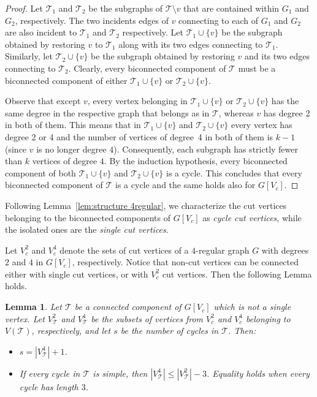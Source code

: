 \documentclass{article}
\newtheorem{lemma}{Lemma}
\begin{document}
\begin{proof}
            Let $\mathcal{T}_1$ and $\mathcal{T}_2$ be the subgraphs of $\mathcal{T}\setminus v$ that are contained within $G_1$ and $G_2$, respectively. 
            The two incidents edges of $v$ connecting to each of $G_1$ and $G_2$ are also incident to $\mathcal{T}_1$ and $\mathcal{T}_2$ respectively.
            Let $\mathcal{T}_1 \cup \{v\}$ be the subgraph obtained by restoring $v$ to $\mathcal{T}_1$ along with its two edges connecting to $\mathcal{T}_1$.
            Similarly, let $\mathcal{T}_2\cup \{v\}$ be the subgraph obtained by restoring $v$ and its two edges connecting to $\mathcal{T}_2$.
            Clearly, every biconnected component of $\mathcal{T}$ must be a biconnected component of either $\mathcal{T}_1\cup\{v\}$ or $\mathcal{T}_2\cup\{v\}$.
            
            Observe that except $v$, every vertex belonging in $\mathcal{T}_1\cup\{v\}$ or $\mathcal{T}_2\cup\{v\}$ has the same degree in the respective graph that belongs as in $\mathcal{T}$, whereas $v$ has degree 2 in both of them.
            This means that in $\mathcal{T}_1\cup\{v\}$ and $\mathcal{T}_2\cup\{v\}$ every vertex has degree 2 or 4 and the number of vertices of degree~4 in both of them is $k-1$ (since $v$ is no longer degree $4$).
            Consequently, each subgraph has strictly fewer than $k$ vertices of degree $4$. 
            By the induction hypothesis, every biconnected component of both $\mathcal{T}_1\cup\{v\}$ and $\mathcal{T}_2\cup\{v\}$ is a cycle.
            This concludes that every biconnected component of $\mathcal{T}$ is a cycle and the same holds also for $G[V_c]$.
        \end{proof}

        Following Lemma~\ref{lem:structure 4regular}, we characterize the cut vertices belonging to the biconnected components of $G[V_c]$ as \emph{cycle cut vertices}, while the isolated ones are the \emph{single cut vertices}.

        Let $V^2_{c}$ and $V^4_{c}$ denote the sets of cut vertices of a $4$-regular graph $G$ with degrees $2$ and $4$ in $G[V_c]$, respectively.
        Notice that non-cut vertices can be connected either with single cut vertices, or with $V^2_{c}$ cut vertices. 
        Then the following Lemma holds.

        \begin{lemma}\label{lem:count_c}
            Let $\mathcal{T}$ be a connected component of $G[V_c]$ which is not a single vertex.
            Let $V^2_{\mathcal{T}}$ and $V^4_{\mathcal{T}}$ be the subsets of vertices from $V^2_{c}$ and $V^4_{c}$ belonging to $V(\mathcal{T})$, respectively, and let $s$ be the number of cycles in $\mathcal{T}$.
            Then:
            \begin{itemize}
                \item[(i)]  $s=|V^4_{\mathcal{T}}|+1$.
                \item[(ii)] If every cycle in $\mathcal{T}$ is simple, then $|V^4_{\mathcal{T}}|\leq |V^2_{\mathcal{T}}|-3$.
                Equality holds when every cycle has length $3$.
            \end{itemize}
        \end{lemma}
\end{document}

